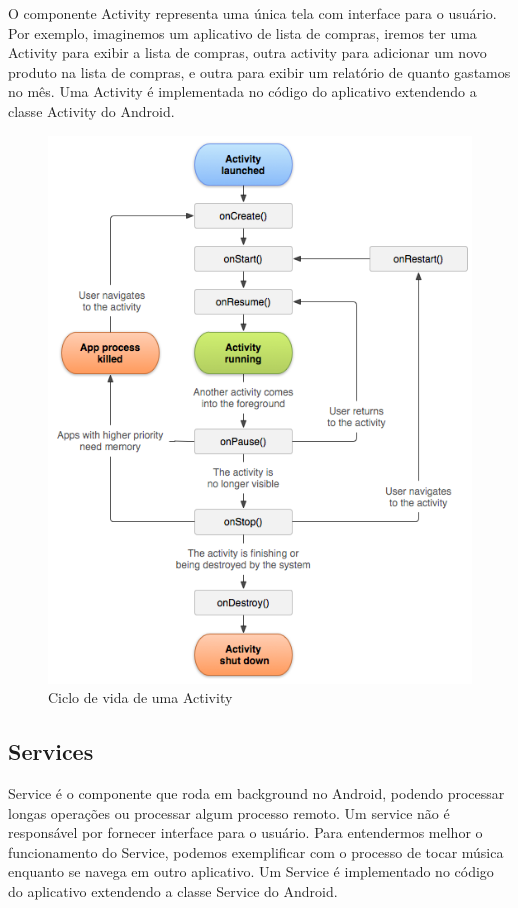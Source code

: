 \documentclass[12pt, %
openright, 
oneside,
a4paper,
brazil]{facom-ufu-abntex2}
\begin{document}
	O componente Activity representa uma única tela com interface para o usuário. Por exemplo, imaginemos um aplicativo de lista de compras, iremos ter uma Activity para exibir a lista de compras, outra activity para adicionar um novo produto na lista de compras, e outra para exibir um relatório de quanto gastamos no mês.
	Uma Activity é implementada no código do aplicativo extendendo a classe Activity do Android.
	
	\begin{figure}[hbt]
  		\includegraphics [scale=.7] {activity_lifecycle}
  		\caption{Ciclo de vida de uma Activity \cite{docAndroid}}
	\end{figure}

	
	\subsection{Services}
	Service é o componente que roda em background no Android, podendo processar longas operações ou processar algum processo remoto. Um service não é responsável por fornecer interface para o usuário. Para entendermos melhor o funcionamento do Service, podemos exemplificar com o processo de tocar música enquanto se navega em outro aplicativo.
	Um Service é implementado no código do aplicativo extendendo a classe Service do Android.\cite{docAndroid}
	
\end{document}
